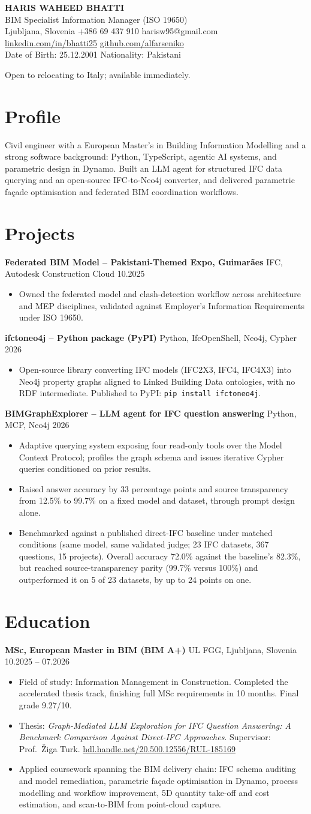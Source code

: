 \documentclass[a4paper,10.5pt]{article}
\newcommand{\datefill}{\dotfill}
\newcommand{\entry}[3]{\vspace{2.5pt}\noindent\textbf{#1} \textbar{} #2 \datefill{} #3\par\vspace{0.5pt}}
\newcommand{\ROLELINE}{BIM Specialist \textbar{} Information Manager (ISO 19650)}
\newcommand{\projIfcToNeo}{%
\entry{ifctoneo4j -- Python package (PyPI)}{Python, IfcOpenShell, Neo4j, Cypher}{2026}
\begin{itemize}
  \item Open-source library converting IFC models (IFC2X3, IFC4, IFC4X3) into Neo4j
        property graphs aligned to Linked Building Data ontologies, with no RDF
        intermediate. Published to PyPI: \texttt{pip install ifctoneo4j}.
\end{itemize}}
\newcommand{\projBIMGraph}{%
\entry{BIMGraphExplorer -- LLM agent for IFC question answering}{Python, MCP, Neo4j}{2026}
\begin{itemize}
  \item Adaptive querying system exposing four read-only tools over the Model
        Context Protocol; profiles the graph schema and issues iterative Cypher
        queries conditioned on prior results.
  \item Raised answer accuracy by 33 percentage points and source transparency from
        12.5\% to 99.7\% on a fixed model and dataset, through prompt design alone.
  \item Benchmarked against a published direct-IFC baseline under matched
        conditions (same model, same validated judge; 23 IFC datasets, 367
        questions, 15 projects). Overall accuracy 72.0\% against the baseline's
        82.3\%, but reached source-transparency parity (99.7\% versus 100\%) and
        outperformed it on 5 of 23 datasets, by up to 24 points on one.
\end{itemize}}
\newcommand{\projGuimaraes}{%
\entry{Federated BIM Model -- Pakistani-Themed Expo, Guimar\~aes}{IFC, Autodesk Construction Cloud}{10.2025}
\begin{itemize}
  \item Owned the federated model and clash-detection workflow across architecture
        and MEP disciplines, validated against Employer's Information Requirements
        under ISO 19650.
\end{itemize}}
\begin{document}
\begin{center}
  {\LARGE\bfseries HARIS WAHEED BHATTI}\\[2pt]
  {\large \ROLELINE}\\[3pt]
  Ljubljana, Slovenia \textbar{} +386 69 437 910 \textbar{} harisw95@gmail.com\\
  \href{https://linkedin.com/in/bhatti25}{linkedin.com/in/bhatti25} \textbar{}
  \href{https://github.com/alfarseniko}{github.com/alfarseniko}\\
  Date of Birth: 25.12.2001 \textbar{} Nationality: Pakistani
\end{center}
\vspace{-4pt}
\noindent\small Open to relocating to Italy; available immediately.\normalsize

\section{Profile}

\noindent Civil engineer with a European Master's in Building Information Modelling and
a strong software background: Python, TypeScript, agentic AI systems, and parametric
design in Dynamo. Built an LLM agent for structured IFC data querying and an
open-source IFC-to-Neo4j converter, and delivered parametric fa\c{c}ade optimisation
and federated BIM coordination workflows.

\section{Projects}

 \projGuimaraes \projIfcToNeo \projBIMGraph

\section{Education}
\entry{MSc, European Master in BIM (BIM A+)}{UL FGG, Ljubljana, Slovenia}{10.2025 -- 07.2026}
\begin{itemize}
  \item Field of study: Information Management in Construction. Completed the
        accelerated thesis track, finishing full MSc requirements in 10 months.
        Final grade 9.27/10.
  \item Thesis: \textit{Graph-Mediated LLM Exploration for IFC Question Answering:
        A Benchmark Comparison Against Direct-IFC Approaches}. Supervisor:
        Prof.~\v{Z}iga Turk. \href{http://hdl.handle.net/20.500.12556/RUL-185169}{hdl.handle.net/20.500.12556/RUL-185169}
  \item Applied coursework spanning the BIM delivery chain: IFC schema auditing and model remediation, parametric façade optimisation in Dynamo, process modelling and workflow improvement, 5D quantity take-off and cost estimation, and scan-to-BIM from point-cloud capture.
\end{itemize}
\end{document}
